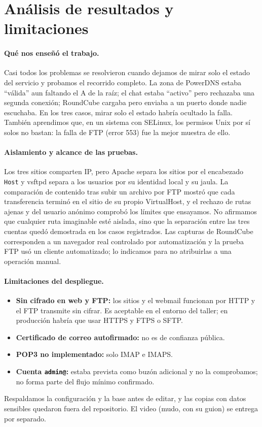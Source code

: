 \documentclass[11pt,a4paper]{article}
\begin{document}
\section{Análisis de resultados y limitaciones}
\paragraph{Qué nos enseñó el trabajo.} Casi todos los problemas se resolvieron cuando dejamos de mirar solo el estado del servicio y probamos el recorrido completo. La zona de PowerDNS estaba ``válida'' aun faltando el A de la raíz; el chat estaba ``activo'' pero rechazaba una segunda conexión; RoundCube cargaba pero enviaba a un puerto donde nadie escuchaba. En los tres casos, mirar solo el estado habría ocultado la falla. También aprendimos que, en un sistema con SELinux, los permisos Unix por sí solos no bastan: la falla de FTP (error 553) fue la mejor muestra de ello.

\paragraph{Aislamiento y alcance de las pruebas.} Los tres sitios comparten IP, pero Apache separa los sitios por el encabezado \texttt{Host} y vsftpd separa a los usuarios por su identidad local y su jaula. La comparación de contenido tras subir un archivo por FTP mostró que cada transferencia terminó en el sitio de su propio VirtualHost, y el rechazo de rutas ajenas y del usuario anónimo comprobó los límites que ensayamos. No afirmamos que cualquier ruta imaginable esté aislada, sino que la separación entre las tres cuentas quedó demostrada en los casos registrados. Las capturas de RoundCube corresponden a un navegador real controlado por automatización y la prueba FTP usó un cliente automatizado; lo indicamos para no atribuirlas a una operación manual.

\paragraph{Limitaciones del despliegue.}
\begin{itemize}\setlength\itemsep{0pt}
\item \textbf{Sin cifrado en web y FTP:} los sitios y el webmail funcionan por HTTP y el FTP transmite sin cifrar. Es aceptable en el entorno del taller; en producción habría que usar HTTPS y FTPS o SFTP.
\item \textbf{Certificado de correo autofirmado:} no es de confianza pública.
\item \textbf{POP3 no implementado:} solo IMAP e IMAPS.
\item \textbf{Cuenta \texttt{admin@}:} estaba prevista como buzón adicional y no la comprobamos; no forma parte del flujo mínimo confirmado.
\end{itemize}
Respaldamos la configuración y la base antes de editar, y las copias con datos sensibles quedaron fuera del repositorio. El video (mudo, con su guion) se entrega por separado.
\end{document}
